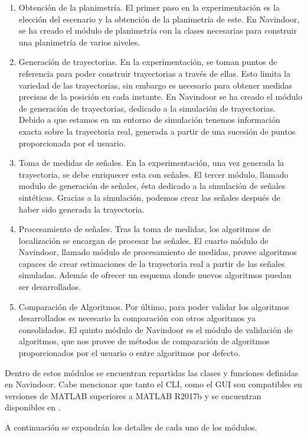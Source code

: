 \begin{enumerate}
    \item Obtención de la planimetría. El primer paso en la experimentación es la elección del escenario y la obtención de la planimetría de este. En Navindoor, se ha creado el módulo de planimetría con la clases necesarias para construir una planimetría de varios niveles. 
    \item Generación de trayectorias. En la experimentación, se toman puntos de referencia para poder construir trayectorias a través de ellas. Esto limita la variedad de las trayectorias, sin embargo es necesario para obtener medidas precisas de la posición en cada instante. 
    En Navindoor se ha creado el módulo de generación de trayectorias, dedicado a la simulación de trayectorias. Debido a que estamos en un entorno de simulación tenemos información exacta sobre la trayectoria real, generada a partir de una sucesión de puntos proporcionada por el usuario.
    \item Toma de medidas de señales. En la experimentación, una vez generada la trayectoria, se debe enriquecer esta con señales. El tercer módulo, llamado modulo de generación de señales, ésta dedicado a la simulación de señales sintéticas. Gracias a la simulación, podemos crear las señales después de haber sido generada la trayectoria. 
    \item Procesamiento de señales. Tras la toma de medidas, los algoritmos de localización se encargan de procesar las señales. El cuarto módulo de Navindoor, llamado módulo de procesamiento de medidas, provee algoritmos capaces de crear estimaciones de la trayectoria real a partir de las señales simuladas. Además de ofrecer un esquema donde nuevos algoritmos puedan ser desarrollados.
    \item Comparación de Algoritmos. Por último, para poder validar los algoritmos desarrollados es necesario la comparación con otros algoritmos ya consolidados. El quinto módulo de Navindoor es el módulo de validación de algoritmos, que nos provee de métodos de comparación de algoritmos proporcionados por el usuario o entre algoritmos por defecto.
\end{enumerate}
Dentro de estos módulos se encuentran repartidas las clases y funciones definidas en Navindoor. Cabe mencionar que tanto el CLI, como el GUI son compatibles en versiones de MATLAB superiores a MATLAB R2017b y se encuentran disponibles en \cite{navindoor}.

A continuación se expondrán los detalles de cada uno de los módulos.